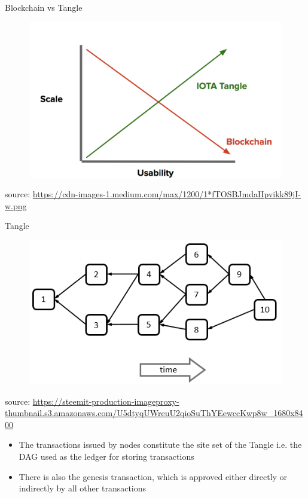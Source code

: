 \documentclass[11pt]{beamer}
\begin{document}
\begin{frame}{Blockchain vs Tangle}
	\begin{figure}[]
		\centering
		\includegraphics  [scale=0.2]{Images/tanglevsblock}
	\end{figure}
	\begin{scriptsize}
		source: \href{https://blog.iota.org/a-primer-on-iota-with-presentation-e0a6eb2cc621}{https://cdn-images-1.medium.com/max/1200/1*fTOSBJmdaIIpvikk89jI-w.png}
	\end{scriptsize}
\end{frame}


\begin{frame}{Tangle}
	\begin{figure}[]
		\centering
		\includegraphics  [scale=0.35]{Images/iota-dag}
	\end{figure}
	\begin{scriptsize}
		source: \href{https://steemkr.com/iota/@wolfofcrypto/iota-is-it-worth-one-iota}{https://steemit-production-imageproxy-thumbnail.s3.amazonaws.com/U5dtyqUWreuU2qioSuThYEewccKwp8w\_1680x8400}
	\end{scriptsize}
	\begin{itemize}
		\item The transactions issued by nodes constitute the site set of the Tangle i.e. the DAG used as the ledger for storing transactions
		\item There is also the genesis transaction, which is approved either directly or indirectly by all other transactions
	\end{itemize}
\end{frame}
\end{document}
